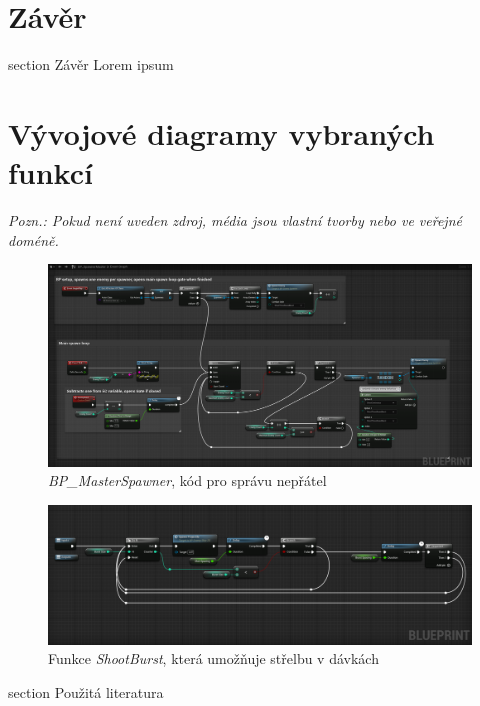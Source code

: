 \documentclass[12pt,a4paper,hidelinks]{article}
\begin{document}
\clearpage
\section*{Závěr}
 {section} {Závěr}
Lorem ipsum


\clearpage
\appendix
\section{Vývojové diagramy vybraných funkcí}
\textit{Pozn.: Pokud není uveden zdroj, média jsou vlastní tvorby nebo ve veřejné doméně.}

\begin{figure}[h!]
\centering
\includegraphics[width=1.0\linewidth]{images/masterspawner_nodesc.png}
\caption{\textit{BP{\_}MasterSpawner}, kód pro správu nepřátel}
\label{masterspawner}
\end{figure}
\clearpage

\begin{figure}[h!]
\centering
\includegraphics[width=1.0\linewidth]{images/shoot_burst.png}
\caption{Funkce \textit{ShootBurst}, která umožňuje střelbu v dávkách}
\label{burst}
\end{figure}
\clearpage



\printbibliography
{} {section} {Použitá literatura}
\end{document}
